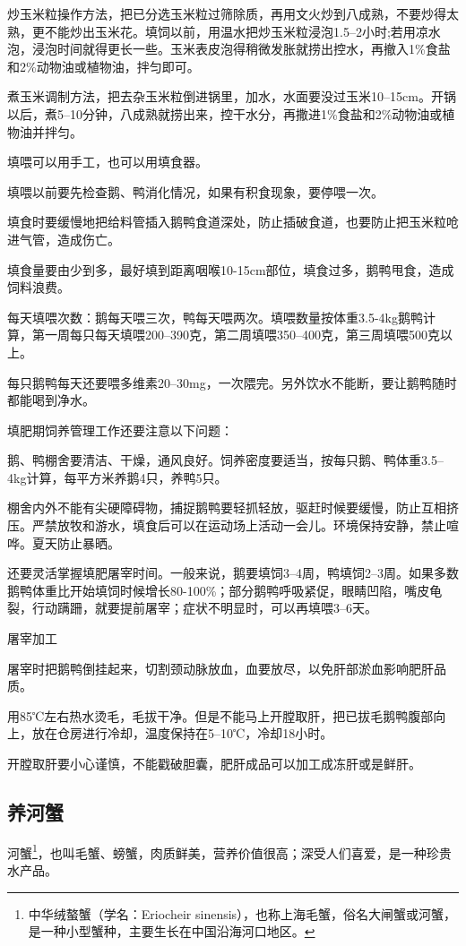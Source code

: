 \documentclass{ctexbook}
\begin{document}
炒玉米粒操作方法，把已分选玉米粒过筛除质，再用文火炒到八成熟，不要炒得太熟，更不能炒出玉米花。填饲以前，用温水把炒玉米粒浸泡1.5--2小时;若用凉水泡，浸泡时间就得更长一些。玉米表皮泡得稍微发胀就捞出控水，再撤入1\%食盐和2\%动物油或植物油，拌匀即可。

煮玉米调制方法，把去杂玉米粒倒进锅里，加水，水面要没过玉米10--15cm。开锅以后，煮5--10分钟，八成熟就捞出来，控干水分，再撒进1\%食盐和2\%动物油或植物油并拌匀。

填喂可以用手工，也可以用填食器。

填喂以前要先检查鹅、鸭消化情况，如果有积食现象，要停喂一次。

填食时要缓慢地把给料管插入鹅鸭食道深处，防止插破食道，也要防止把玉米粒呛进气管，造成伤亡。

填食量要由少到多，最好填到距离咽喉10-15cm部位，填食过多，鹅鸭甩食，造成饲料浪费。

每天填喂次数：鹅每天喂三次，鸭每天喂两次。填喂数量按体重3.5-4kg鹅鸭计算，第一周每只每天填喂200--390克，第二周填喂350--400克，第三周填喂500克以上。

每只鹅鸭每天还要喂多维素20--30mg，一次隈完。另外饮水不能断，要让鹅鸭随时都能喝到净水。

填肥期饲养管理工作还要注意以下问题：

鹅、鸭棚舍要清洁、干燥，通风良好。饲养密度要适当，按每只鹅、鸭体重3.5--4kg计算，每平方米养鹅4只，养鸭5只。

棚舍内外不能有尖硬障碍物，捕捉鹅鸭要轻抓轻放，驱赶时候要缓慢，防止互相挤压。严禁放牧和游水，填食后可以在运动场上活动一会儿。环境保持安静，禁止喧哗。夏天防止暴晒。

还要灵活掌握填肥屠宰时间。一般来说，鹅要填饲3--4周，鸭填饲2--3周。如果多数鹅鸭体重比开始填饲时候增长80-100\%；部分鹅鸭呼吸紧促，眼睛凹陷，嘴皮龟裂，行动蹒跚，就要提前屠宰；症状不明显时，可以再填喂3--6天。

屠宰加工

屠宰时把鹅鸭倒挂起来，切割颈动脉放血，血要放尽，以免肝部淤血影响肥肝品质。

用85℃左右热水烫毛，毛拔干净。但是不能马上开膛取肝，把已拔毛鹅鸭腹部向上，放在仓房进行冷却，温度保持在5--10℃，冷却18小时。

开膛取肝要小心谨慎，不能戳破胆囊，肥肝成品可以加工成冻肝或是鲜肝。
\subsection{养河蟹}
河蟹\footnote{中华绒螯蟹（学名：Eriocheir sinensis），也称上海毛蟹，俗名大闸蟹或河蟹，是一种小型蟹种，主要生长在中国沿海河口地区。}，也叫毛蟹、螃蟹，肉质鲜美，营养价值很高；深受人们喜爱，是一种珍贵水产品。
\end{document}
